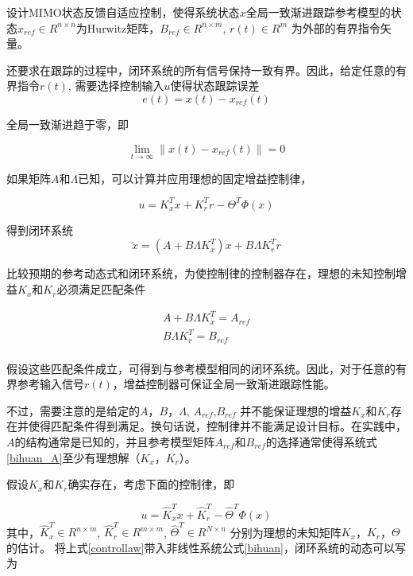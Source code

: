 设计MIMO状态反馈自适应控制，使得系统状态$x$全局一致渐进跟踪参考模型的状态$x_{ref} \in R^{n \times n}$为Hurwitz矩阵，$B_{ref} \in R^{n \times m}$, $r(t) \in R^{m}$ 为外部的有界指令矢量。

还要求在跟踪的过程中，闭环系统的所有信号保持一致有界。因此，给定任意的有界指令$r(t)$, 需要选择控制输入$u$使得状态跟踪误差
\begin{equation}
\label{bihuan}
e(t)=x(t)-x_{ref}(t)
\end{equation}

全局一致渐进趋于零，即

\begin{equation}
\mathop {\lim }\limits_{t \to \infty } \left\| {x(t) - {x_{ref}}(t)} \right\| = 0
\end{equation}

如果矩阵$A$和$\Lambda$已知，可以计算并应用理想的固定增益控制律，

\begin{equation}
u = K_x^Tx + K_r^Tr - {\Theta ^T}\Phi (x)
\end{equation}

得到闭环系统
\begin{equation}
\label{bihuan_A}
\dot x = (A + B\Lambda K_x^T)x + B\Lambda K_r^Tr
\end{equation}

比较预期的参考动态式和闭环系统，为使控制律的控制器存在，理想的未知控制增益$K_x$和$K_r$必须满足匹配条件

\begin{equation}
\label{Aref}
\begin{array}{*{20}{c}}
   {A + B\Lambda K_x^T = {A_{ref}}}  \\
   {B\Lambda K_r^T = {B_{ref}}}  \\
\end{array}
\end{equation}

假设这些匹配条件成立，可得到与参考模型相同的闭环系统。因此，对于任意的有界参考输入信号$r(t)$，增益控制器可保证全局一致渐进跟踪性能。

不过，需要注意的是给定的$A$，$B$，$\Lambda$, $A_{ref}$,$B_{ref}$ 并不能保证理想的增益$K_x$和$K_r$存在并使得匹配条件得到满足。换句话说，控制律并不能满足设计目标。在实践中，$A$的结构通常是已知的，并且参考模型矩阵$A_{ref}$和$B_{ref}$的选择通常使得系统式\ref{bihuan_A}至少有理想解（$K_x$，$K_r$）。

假设$K_x$和$K_r$确实存在，考虑下面的控制律，即

\begin{equation}
\label{controllaw}
u = \hat K_x^Tx + \hat K_r^T - {\hat \Theta ^T}\Phi \left( x \right)
\end{equation}
其中，$\hat K_x^T \in R^{n \times m}$, $\hat K_r^T \in R^{m \times m}$,  ${\hat \Theta ^T} \in R^{N \times n}$ 分别为理想的未知矩阵$K_x$，$K_r$，$\Theta$的估计。 将上式\ref{controllaw}带入非线性系统公式\ref{bihuan}，闭环系统的动态可以写为


